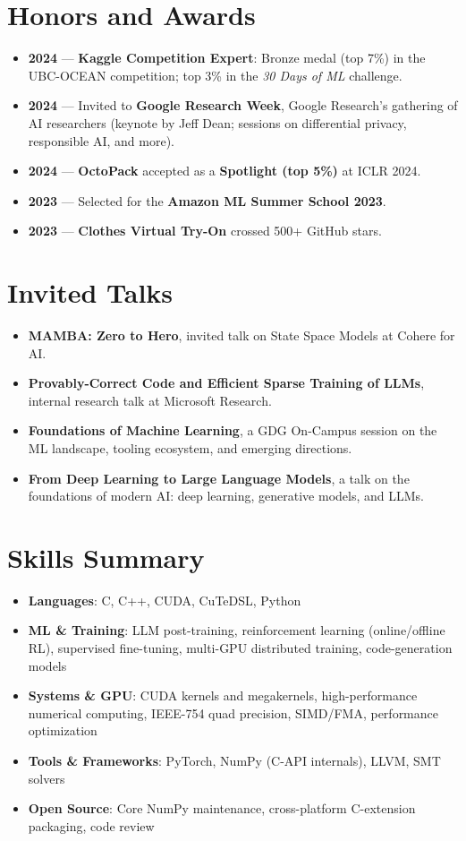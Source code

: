 \documentclass[a4paper,11pt]{article}
\newcommand{\resumeItem}[2]{\item\small{\textbf{#1}: #2}\vspace{-1pt}}
\newcommand{\resumeItemPlain}[1]{\item\small{#1}\vspace{-1pt}}
\newcommand{\resumeItemListStart}{\begin{itemize}[leftmargin=1.3em, label=$\bullet$, itemsep=1pt, topsep=2pt, parsep=0pt]}
\newcommand{\resumeItemListEnd}{\end{itemize}\vspace{-3pt}}
\begin{document}
\vspace{-2pt}
\section{Honors and Awards}
\resumeItemListStart
  \resumeItemPlain{\textbf{2024} --- \textbf{Kaggle Competition Expert}: Bronze medal (top 7\%) in the UBC-OCEAN competition; top 3\% in the \textit{30 Days of ML} challenge.}
  \resumeItemPlain{\textbf{2024} --- Invited to \textbf{Google Research Week}, Google Research's gathering of AI researchers (keynote by Jeff Dean; sessions on differential privacy, responsible AI, and more).}
  \resumeItemPlain{\textbf{2024} --- \textbf{OctoPack} accepted as a \textbf{Spotlight (top 5\%)} at ICLR 2024.}
  \resumeItemPlain{\textbf{2023} --- Selected for the \textbf{Amazon ML Summer School 2023}.}
  \resumeItemPlain{\textbf{2023} --- \textbf{Clothes Virtual Try-On} crossed 500+ GitHub stars.}
\resumeItemListEnd

\vspace{-2pt}
\section{Invited Talks}
\resumeItemListStart
  \resumeItemPlain{\textbf{MAMBA: Zero to Hero}, invited talk on State Space Models at Cohere for AI.}
  \resumeItemPlain{\textbf{Provably-Correct Code and Efficient Sparse Training of LLMs}, internal research talk at Microsoft Research.}
  \resumeItemPlain{\textbf{Foundations of Machine Learning}, a GDG On-Campus session on the ML landscape, tooling ecosystem, and emerging directions.}
  \resumeItemPlain{\textbf{From Deep Learning to Large Language Models}, a talk on the foundations of modern AI: deep learning, generative models, and LLMs.}
\resumeItemListEnd

\vspace{-2pt}
\section{Skills Summary}
\resumeItemListStart
  \resumeItem{Languages}{C, C++, CUDA, CuTeDSL, Python}
  \resumeItem{ML \& Training}{LLM post-training, reinforcement learning (online/offline RL), supervised fine-tuning, multi-GPU distributed training, code-generation models}
  \resumeItem{Systems \& GPU}{CUDA kernels and megakernels, high-performance numerical computing, IEEE-754 quad precision, SIMD/FMA, performance optimization}
  \resumeItem{Tools \& Frameworks}{PyTorch, NumPy (C-API internals), LLVM, SMT solvers}
  \resumeItem{Open Source}{Core NumPy maintenance, cross-platform C-extension packaging, code review}
\resumeItemListEnd
\end{document}
